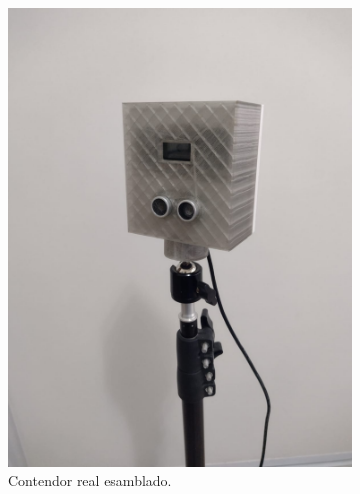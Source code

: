 \begin{figure}[bth]
    \centering
    \begin{subfigure}{.45\textwidth}
        \centering
        \includegraphics[width=\textwidth]{imgs/contenedor-real.jpeg}
        \caption{Contendor real esamblado.}
    \end{subfigure}
    \begin{subfigure}{.45\textwidth}
        \centering

\end{subfigure}
\end{figure}

